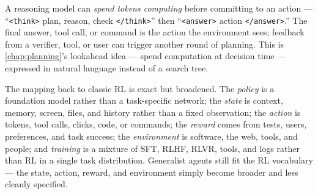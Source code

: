 \documentclass[11pt, oneside]{book}
\begin{document}
\begin{intbox}[title={Text as computation: planning before acting}]
A reasoning model can \emph{spend tokens computing} before committing to an action ---
``\texttt{<think>} plan, reason, check \texttt{</think>}'' then ``\texttt{<answer>} action
\texttt{</answer>}.'' The final answer, tool call, or command is the action the environment
sees; feedback from a verifier, tool, or user can trigger another round of planning. This is
\cref{chap:planning}'s lookahead idea --- spend computation at decision time --- expressed in
natural language instead of a search tree.
\end{intbox}

The mapping back to classic RL is exact but broadened. The \emph{policy} is a foundation
model rather than a task-specific network; the \emph{state} is context, memory, screen,
files, and history rather than a fixed observation; the \emph{action} is tokens, tool calls,
clicks, code, or commands; the \emph{reward} comes from tests, users, preferences, and task
success; the \emph{environment} is software, the web, tools, and people; and \emph{training}
is a mixture of SFT, RLHF, RLVR, tools, and logs rather than RL in a single task
distribution. Generalist agents still fit the RL vocabulary --- the state, action, reward,
and environment simply become broader and less cleanly specified.
\end{document}
